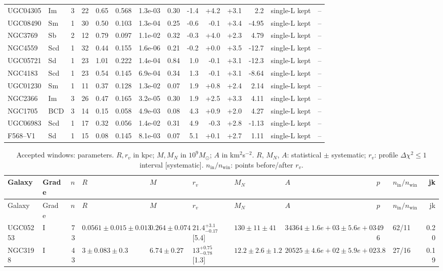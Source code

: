 \documentclass[10pt]{article}
\begin{document}
\begin{landscape}
{\begin{longtable}{lllrrrrrrrrrll}
UGC04305 & Im & 3 & 22 & 0.65 & 0.568 & 1.3e-03 & 0.30 & -1.4 & +4.2 & +3.1 & 2.2 & single-L kept & --\\
UGC08490 & Sm & 1 & 30 & 0.50 & 0.103 & 1.3e-04 & 0.25 & -0.6 & -0.1 & +3.4 & -4.95 & single-L kept & --\\
NGC3769 & Sb & 2 & 12 & 0.79 & 0.097 & 1.1e-02 & 0.32 & -0.3 & +4.0 & +2.3 & 4.79 & single-L kept & --\\
NGC4559 & Scd & 1 & 32 & 0.44 & 0.155 & 1.6e-06 & 0.21 & -0.2 & +0.0 & +3.5 & -12.7 & single-L kept & --\\
UGC05721 & Sd & 1 & 23 & 1.01 & 0.222 & 1.4e-04 & 0.84 & 1.0 & -0.1 & +3.1 & -12.3 & single-L kept & --\\
NGC4183 & Scd & 1 & 23 & 0.54 & 0.145 & 6.9e-04 & 0.34 & 1.3 & -0.1 & +3.1 & -8.64 & single-L kept & --\\
UGC01230 & Sm & 1 & 11 & 0.37 & 0.128 & 1.3e-02 & 0.07 & 1.9 & +0.8 & +2.4 & 2.14 & single-L kept & --\\
NGC2366 & Im & 3 & 26 & 0.47 & 0.165 & 3.2e-05 & 0.30 & 1.9 & +2.5 & +3.3 & 4.11 & single-L kept & --\\
NGC1705 & BCD & 3 & 14 & 0.15 & 0.058 & 4.9e-03 & 0.08 & 4.3 & +0.9 & +2.0 & 4.27 & single-L kept & --\\
UGC06983 & Scd & 1 & 17 & 0.32 & 0.056 & 1.4e-02 & 0.31 & 4.9 & -0.3 & +2.8 & -1.13 & single-L kept & --\\
F568--V1 & Sd & 1 & 15 & 0.08 & 0.145 & 8.1e-03 & 0.07 & 5.1 & +0.1 & +2.7 & 1.11 & single-L kept & --\\
\end{longtable}
\begin{longtable}{llrlllllllr}
\caption{Accepted windows: parameters. $R,r_v$ in kpc; $M,M_N$ in $10^9M_\odot$; $A$ in km$^2$s$^{-2}$. $R$, $M_N$, $A$: statistical $\pm$ systematic; $r_v$: profile $\Delta\chi^2\le1$ interval [systematic]. $n_\mathrm{in}/n_\mathrm{win}$: points before/after $r_v$.}\\\toprule
Galaxy & Grade & $n$ & $R$ & $M$ & $r_v$ & $M_N$ & $A$ & $p$ & $n_\mathrm{in}/n_\mathrm{win}$ & jk\\\midrule\endfirsthead
\toprule Galaxy & Grade & $n$ & $R$ & $M$ & $r_v$ & $M_N$ & $A$ & $p$ & $n_\mathrm{in}/n_\mathrm{win}$ & jk\\\midrule\endhead\bottomrule\endfoot
UGC05253 & I & 73 & $0.0561\pm0.015\pm0.013$ & $0.264\pm0.074$ & $21.4^{+3.1}_{-0.17}$ [5.4] & $130\pm11\pm41$ & $34364\pm1.6e+03\pm5.6e+03$ & 496 & 62/11 & 0.20\\
NGC3198 & I & 43 & $3\pm0.083\pm0.3$ & $6.74\pm0.27$ & $13^{+0.75}_{-0.78}$ [1.3] & $12.2\pm2.6\pm1.2$ & $20525\pm4.6e+02\pm5.9e+02$ & 3.8 & 27/16 & 0.19\\

\end{longtable}}
\end{landscape}
\end{document}
